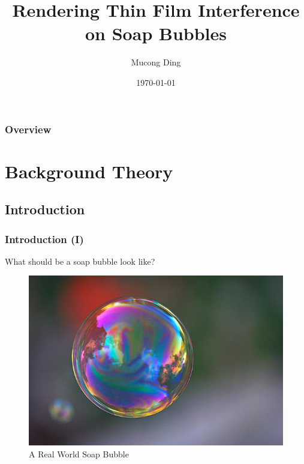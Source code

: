 \documentclass{beamer}
\title[COMP 5411 Rendering Project]{Rendering Thin Film Interference on Soap Bubbles} %
\author{Mucong Ding} %
\institute[HKUST] %
{
Hong Kong University of Science and Technology \\ %
\medskip
\textit{mcding@connect.ust.hk} %
}
\date{\today} %
\begin{document}
\begin{frame}
\titlepage %
\end{frame}

\begin{frame}
\frametitle{Overview} %
\begin{multicols}{2}
	\tableofcontents
\end{multicols} %
\end{frame}


\section{Background Theory}

\subsection{Introduction}

\begin{frame}
	\frametitle{Introduction (I)}
	What should be a soap bubble look like?
	\begin{figure}
	\centering
	\includegraphics[width=0.5\linewidth]{real_world_bubble.jpg}
	\caption{A Real World Soap Bubble}
	\end{figure}
\end{frame}
\end{document}
